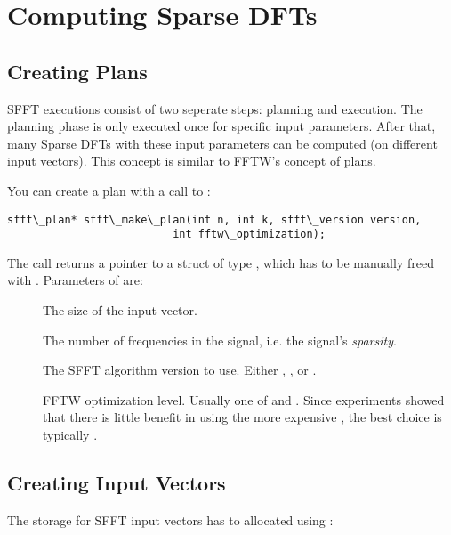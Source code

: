 \documentclass[letterpaper,10pt,english]{sphinxmanual}
\begin{document}
\section{Computing Sparse DFTs}
\label{usage:computing-sparse-dfts}

\subsection{Creating Plans}
\label{usage:creating-plans}
SFFT executions consist of two seperate steps: planning and execution. The
planning phase is only executed once for specific input parameters. After
that, many Sparse DFTs with these input parameters can be computed (on
different input vectors). This concept is similar to FFTW's concept of plans.

You can create a plan with a call to :

\begin{Verbatim}[commandchars=\\\{\}]
sfft\_plan* sfft\_make\_plan(int n, int k, sfft\_version version,
                          int fftw\_optimization);
\end{Verbatim}

The call returns a pointer to a struct of type , which has to be
manually freed with . Parameters of  are:
\begin{description}
\item[{}] \leavevmode
The size of the input vector.

\item[{}] \leavevmode
The number of frequencies in the signal, i.e. the signal's \emph{sparsity}.

\item[{}] \leavevmode
The SFFT algorithm version to use. Either ,
, or .

\item[{}] \leavevmode
FFTW optimization level. Usually one of  and
. Since experiments showed that there is little benefit
in using the more expensive , the best choice is typically
.

\end{description}


\subsection{Creating Input Vectors}
\label{usage:creating-input-vectors}
The storage for SFFT input vectors has to allocated using :
\end{document}

